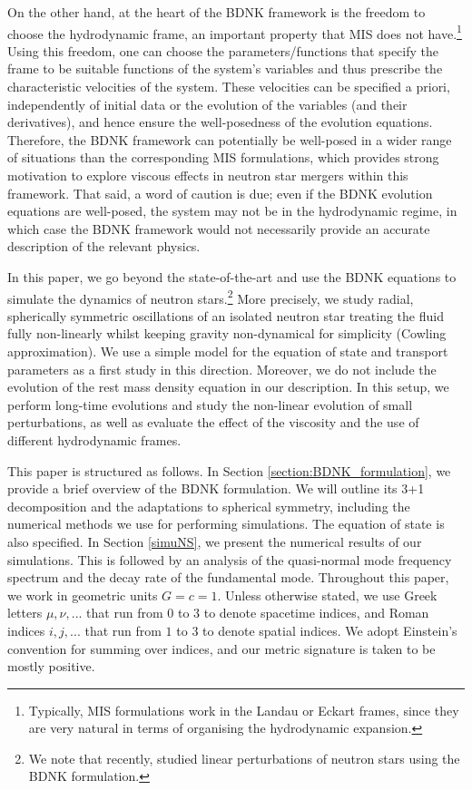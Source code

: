 \documentclass[prd,aps,twocolumn,floats,floatfix,nofootinbib,superscriptaddress] {revtex4-1}
\begin{document}
On the other hand, at the heart of the BDNK framework is the freedom to choose the hydrodynamic frame, an important property that MIS does not have.\footnote{Typically, MIS formulations work in the Landau or Eckart frames, since they are very natural in terms of organising the hydrodynamic expansion.} Using this freedom, one can choose the parameters/functions that specify the frame to be suitable functions of the system's variables and thus prescribe the characteristic velocities of the system. These velocities can be specified a priori, independently of initial data or the evolution of the variables (and their derivatives), and hence ensure the well-posedness of the evolution equations. Therefore, the BDNK framework can potentially be  well-posed in a wider range of situations than the corresponding MIS formulations, which provides strong motivation to explore viscous effects in neutron star mergers within this framework. That said, a word of caution is due; even if the BDNK evolution equations are well-posed, the system may not be in the hydrodynamic regime, in which case the BDNK framework would not necessarily provide an accurate description of the relevant physics. 


In this paper, we go beyond the state-of-the-art and use the BDNK equations to simulate the dynamics of neutron stars.\footnote{We note that recently, \cite{caballero2025neutronstarradialperturbations,Redondo-Yuste:2025ktt}
studied linear perturbations of  neutron stars using the BDNK formulation.} More precisely, we study radial, spherically symmetric oscillations of an isolated neutron star treating the fluid fully non-linearly whilst keeping gravity non-dynamical for simplicity (Cowling approximation). We use a simple model for the equation of state and transport parameters as a first study in this direction. Moreover, we do not include the evolution of the rest mass density equation in our description. In this setup, we perform long-time evolutions and study the non-linear evolution of small perturbations, as well as evaluate the effect of the viscosity and the use of different hydrodynamic frames.

This paper is structured as follows.  In Section \ref{section:BDNK_formulation}, we provide a brief overview of the BDNK formulation.  We will outline its 3+1 decomposition and the adaptations to spherical symmetry, including the numerical methods we use for performing simulations.  The equation of state is also specified.  In Section \ref{simuNS}, we present the numerical results of our simulations.  This is followed by an analysis of the quasi-normal mode frequency spectrum and the decay rate of the fundamental mode.
Throughout this paper, we work in geometric units $G=c=1$.  Unless otherwise stated, we use Greek letters $\mu, \nu, ...$ that run from $0$ to $3$ to denote spacetime indices, and Roman indices $i,j,...$ that run from $1$ to $3$ to denote spatial indices.  We adopt Einstein's convention for summing over indices, and our metric signature is taken to be mostly positive.
\end{document}
